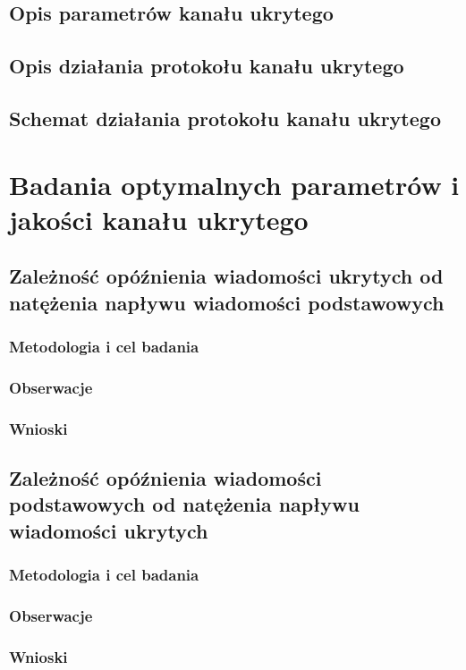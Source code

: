 \documentclass[a4paper, twoside]{report}
\begin{document}
    \section{Opis parametrów kanału ukrytego}
    \section{Opis działania protokołu kanału ukrytego}
    \section{Schemat działania protokołu kanału ukrytego}

\chapter{Badania optymalnych parametrów i jakości kanału ukrytego}
    \section{Zależność opóźnienia wiadomości ukrytych od natężenia napływu wiadomości podstawowych}
        \subsection{Metodologia i cel badania}
        \subsection{Obserwacje}
        \subsection{Wnioski}

    \section{Zależność opóźnienia wiadomości podstawowych od natężenia napływu wiadomości ukrytych}
        \subsection{Metodologia i cel badania}
        \subsection{Obserwacje}
        \subsection{Wnioski}
\end{document}
